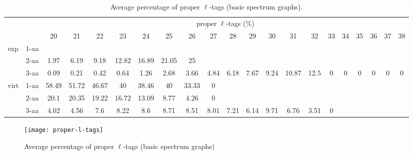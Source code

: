 \documentclass{article}[12pt]
\begin{document}
\begin{landscape}
\begin{table}[h]\tiny
\vspace{3mm}
{\centering
\begin{center}
\begin{tabular}{|c|l|c|c|c|c|c|c|c|c|c|c|c|c|c|c|c|c|c|c|c|}
  \hline
  \multicolumn{2}{|c|}{ } & \multicolumn{ 19 }{|c|}{ proper $\ell$-tags (\%)} \\
  \cline{3- 21}
  \multicolumn{2}{|c|}{ }  & 20 & 21 & 22 & 23 & 24 & 25 & 26 & 27 & 28 & 29 & 30 & 31 & 32 & 33 & 34 & 35 & 36 & 37 & 38\\
  \hline
  \multirow{3}{*}{exp}
&  1-aa  &  &  &  &  &  &  &  &  &  &  &  &  &  &  &  &  &  &  & \\
&  2-aa  & 1.97 & 6.19 & 9.18 & 12.82 & 16.89 & 21.05 & 25 &  &  &  &  &  &  &  &  &  &  &  & \\
&  3-aa  & 0.09 & 0.21 & 0.42 & 0.64 & 1.26 & 2.68 & 3.66 & 4.84 & 6.18 & 7.67 & 9.24 & 10.87 & 12.5 & 0 & 0 & 0 & 0 & 0 & 0\\
 \hline
  \multirow{3}{*}{virt} 
&  1-aa  & 58.49 & 51.72 & 46.67 & 40 & 38.46 & 40 & 33.33 & 0 &  &  &  &  &  &  &  &  &  &  & \\
&  2-aa  & 20.1 & 20.35 & 19.22 & 16.72 & 13.09 & 8.77 & 4.26 & 0 &  &  &  &  &  &  &  &  &  &  & \\
&  3-aa  & 4.02 & 4.56 & 7.6 & 8.22 & 8.6 & 8.71 & 8.51 & 8.01 & 7.21 & 6.14 & 9.71 & 6.76 & 3.51 & 0 &  &  &  &  & \\
 \hline
\end{tabular}
\end{center}
\par}
\centering
\caption{ Average percentage of proper $\ell$-tags (basic spectrum graphs).}
\label{table:proper-l-tags}
\vspace{3mm}
\end{table}

\end{landscape}

\begin{figure}
  \begin{center}
\texttt{[image: proper-l-tags]}
\end{center}
\caption{Average percentage of proper $\ell$-tags (basic spectrum graphs)}
  \label{fig:proper-l-tags}
\end{figure}
\end{document}
